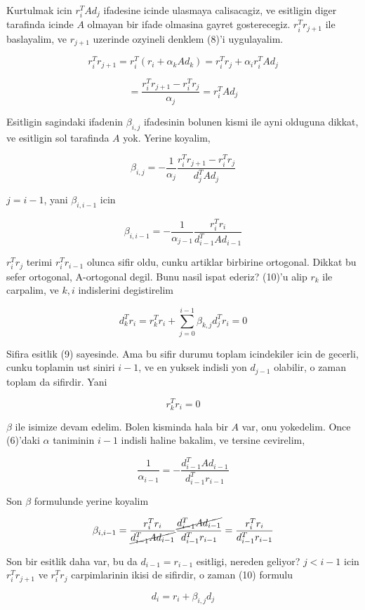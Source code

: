 \documentclass[12pt,fleqn]{article}\usepackage{../common}
\begin{document}
Kurtulmak icin $r_i^TAd_j$ ifadesine icinde ulasmaya calisacagiz, ve
esitligin diger tarafinda icinde $A$ olmayan bir ifade olmasina gayret
gosterecegiz. $r_i^Tr_{j+1}$ ile baslayalim, ve $r_{j+1}$ uzerinde ozyineli
denklem (8)'i uygulayalim. 

\[ r_i^Tr_{j+1} = r_i^T (r_i + \alpha_k A d_k)  = r_i^Tr_j + \alpha_i r_i^TAd_j \]

\[ = \frac{ r_i^Tr_{j+1} - r_i^Tr_j }{\alpha_j} =  r_i^TAd_j \]

Esitligin sagindaki ifadenin $\beta_{i,j}$ ifadesinin bolunen kismi ile
ayni olduguna dikkat, ve esitligin sol tarafinda $A$ yok. Yerine koyalim, 

\[ \beta_{i,j} = - \frac{ 1}{\alpha_j}\frac{  r_i^Tr_{j+1} - r_i^Tr_j }{d_j^TAd_j} \]

$j = i -1$, yani $\beta_{i,i-1}$ icin

\[ \beta_{i,i-1} = - \frac{ 1}{\alpha_{j-1}}\frac{  r_i^Tr_i  }{d_{i-1}^TAd_{i-1}} \]

$r_i^Tr_j$ terimi $r_i^Tr_{i-1}$ olunca sifir oldu, cunku artiklar birbirine ortogonal. 
Dikkat bu sefer ortogonal, A-ortogonal degil. Bunu nasil ispat ederiz? 
(10)'u alip $r_k$ ile carpalim, ve $k,i$ indislerini degistirelim

\[ d_k^Tr_i = r_k^Tr_i + \sum _{ j=0}^{i-1} \beta_{k,j}d_j ^Tr_i = 0
\]

Sifira esitlik (9) sayesinde. Ama bu sifir durumu toplam icindekiler icin
de gecerli, cunku toplamin ust siniri $i-1$, ve en yuksek indisli yon
$d_{j-1}$ olabilir, o zaman toplam da sifirdir. Yani

\[  r_k^Tr_i  = 0 \]

$\beta$ ile isimize devam edelim. Bolen kisminda hala bir $A$ var, onu
yokedelim. Once (6)'daki $\alpha$ taniminin $i-1$ indisli haline bakalim, ve
tersine cevirelim, 

\[ \frac{ 1}{\alpha_{i-1}} = -\frac{d_{i-1}^T A d_{i-1} }{d_{i-1}^Tr_{i-1}} 
\]

Son $\beta$ formulunde yerine koyalim

\[ \beta_{i,i-1} = 
\frac{  r_i^Tr_i  }{ \cancel{d_{i-1}^TAd_{i-1}}} 
\frac{\cancel{d_{i-1}^T A d_{i-1}}}{d_{i-1}^Tr_{i-1}}
= 
\frac{  r_i^Tr_i  }{d_{i-1}^Tr_{i-1}}
\]


Son bir esitlik daha var, bu da $d_{i-1} = r_{i-1}$ esitligi, nereden
geliyor?  $j < i-1$ icin $r_i^Tr_{j+1}$ ve $r_i^Tr_{j}$ carpimlarinin ikisi
de sifirdir, o zaman (10) formulu

\[ d_i = r_i + \beta_{i,j}d_j \]
\end{document}
